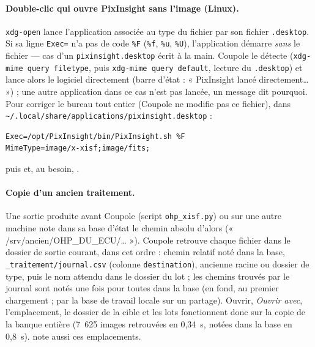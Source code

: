 \paragraph{Double-clic qui ouvre PixInsight sans l'image (Linux).} \texttt{xdg-open} lance l'application associée
au type du fichier par son fichier \texttt{.desktop}. Si sa ligne \texttt{Exec=} n'a pas de code \texttt{\%F}
(\texttt{\%f}, \texttt{\%u}, \texttt{\%U}), l'application démarre \emph{sans} le fichier — cas d'un
\texttt{pixinsight.desktop} écrit à la main. Coupole le détecte (\texttt{xdg-mime query filetype}, puis
\texttt{xdg-mime query default}, lecture du \texttt{.desktop}) et lance alors le logiciel directement (barre
d'état : « PixInsight lancé directement… ») ; une autre application dans ce cas n'est pas lancée, un message dit
pourquoi. Pour corriger le bureau tout entier (Coupole ne modifie pas ce fichier), dans
\texttt{\textasciitilde/.local/share/applications/pixinsight.desktop} :
\begin{verbatim}
Exec=/opt/PixInsight/bin/PixInsight.sh %F
MimeType=image/x-xisf;image/fits;
\end{verbatim}
puis  et, au besoin,
.

\paragraph{Copie d'un ancien traitement.} Une sortie produite avant Coupole (script \texttt{ohp\_xisf.py}) ou sur
une autre machine note dans sa base d'état le chemin absolu d'alors (« /srv/ancien/OHP\_DU\_ECU/… »).
Coupole retrouve chaque fichier dans le dossier de sortie courant, dans cet ordre : chemin relatif noté dans la base,
\texttt{\_traitement/journal.csv} (colonne \texttt{destination}), ancienne racine ou dossier de type, puis le nom
attendu dans le dossier du lot ; les chemins trouvés par le journal sont notés une fois pour toutes dans la base
(en fond, au premier chargement ; par la base de travail locale sur un partage). Ouvrir, \emph{Ouvrir avec},
l'emplacement, le dossier de la cible et les lots fonctionnent donc sur la copie de la banque entière (7~625 images
retrouvées en 0,34~s, notées dans la base en 0,8~s).  note aussi
ces emplacements.

